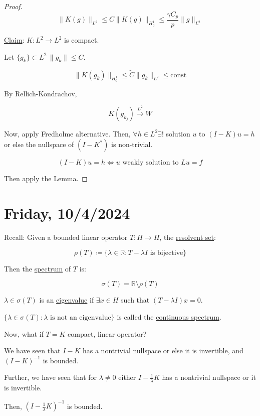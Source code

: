 \documentclass{article}
\theoremstyle{definition}
\begin{document}
\begin{proof}
    \[
        \lVert K(g) \rVert _{L^2} \leq C \lVert K(g) \rVert _{H^1_0} \leq \frac{\gamma C_p}{p}\lVert g \rVert _{L^2}
    \]

    \underline{Claim}: \(K : L^2 \to L^2\) is compact.

    Let \(\{ g_k \} \subset L^2 \, \lVert g_k \rVert \leq C\).

    \[
        \lVert K(g_k) \rVert _{H^1_0} \leq \tilde{C} \lVert g_k \rVert _{L^2} \leq \text{const}  
    \]

    By Rellich-Kondrachov,

    \[
        K(g_{k_j}) \overset{L^2}{\to} W
    \]

    Now, apply Fredholme alternative. Then, \(\forall h\in L^2 \exists !\) solution \(u\) to \((I-K)u = h\) or else the nullspace of \((I-K^{\ast})\) is non-trivial.

    \[
        (I-K)u = h \iff u \text{ weakly solution to }  Lu = f
    \]

    Then apply the Lemma.

\end{proof}

\section*{Friday, 10/4/2024}

Recall: Given a bounded linear operator \(T: H \to H\), the \underline{resolvent set}:

\[
    \rho (T) \coloneqq \{ \lambda \in \mathbb{R} : T - \lambda I \text{ is bijective} \} 
\]

Then the \underline{spectrum} of \(T\) is:

\[
    \sigma (T) = \mathbb{R} \setminus \rho (T)
\]

\(\lambda \in \sigma (T)\) is an \underline{eigenvalue} if \(\exists x\in H\) such that \((T-\lambda I)x = 0\). 

\(\{ \lambda \in \sigma (T) : \lambda \text{ is not an eigenvalue} \} \) is called the \underline{continuous spectrum}.

Now, what if \(T = K\) compact, linear operator?

We have seen that \(I - K\) has a nontrivial nullspace or else it is invertible, and \((I - K)^{-1}\) is bounded. 

Further, we have seen that for \(\lambda \neq 0\) either \(I - \frac{1}{\lambda}K\) has a nontrivial nullspace or it is invertible.

Then, \((I - \frac{1}{\lambda}K) ^{-1}\) is bounded.
\end{document}
